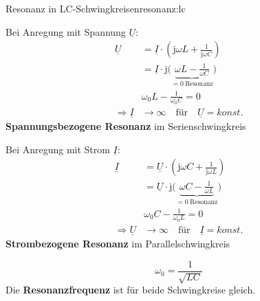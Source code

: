 \begin{frame}
{\begin{bsp}{Resonanz in LC-Schwingkreisen}{resonanz:lc}
    \begin{minipage}{\textwidth}\centering%
        \begin{minipage}{0.48\textwidth}\centering%
            Bei Anregung mit Spannung $\underline{U}$:
            \begin{align*}
                \underline{U}
                &= \underline{I} \cdot \left(\mathrm{j}\omega L + \frac{1}{\mathrm{j}\omega C}\right) \\
                &= \underline{I} \cdot \mathrm{j}\bigg(\underbrace{\omega L - \frac{1}{\omega C}}_{=0\ \text{Resonanz}}\bigg) \\
                &\omega_0 L - \frac{1}{\omega_0 C} = 0 \\
                \Rightarrow \underline{I} &\rightarrow \infty \quad \text{für} \quad \underline{U} = konst.
            \end{align*}
            \textbf{Spannungsbezogene Resonanz}\newline
            im Serienschwingkreis
        \end{minipage}\hfill%
        \begin{minipage}{0.48\textwidth}\centering%
            Bei Anregung mit Strom $\underline{I}$:
            \begin{align*}
                \underline{I}
                &= \underline{U} \cdot \left(\mathrm{j}\omega C + \frac{1}{\mathrm{j}\omega L}\right) \\
                &= \underline{U} \cdot \mathrm{j} \bigg(\underbrace{\omega C - \frac{1}{\omega L}}_{=0\ \text{Resonanz}}\bigg)\\
                &\omega_0 C - \frac{1}{\omega_0 L} = 0 \\
                \Rightarrow \underline{U} &\rightarrow \infty\quad \text{für} \quad \underline{I} = konst.
            \end{align*}
            \textbf{Strombezogene Resonanz}\newline
            im Parallelschwingkreis
        \end{minipage}

        \begin{equation*}
            \omega_0 = \frac{1}{\sqrt{LC}}
        \end{equation*}
        Die \textbf{Resonanzfrequenz} ist für beide Schwingkreise gleich.
    \end{minipage}
\end{bsp}

}
\end{frame}

